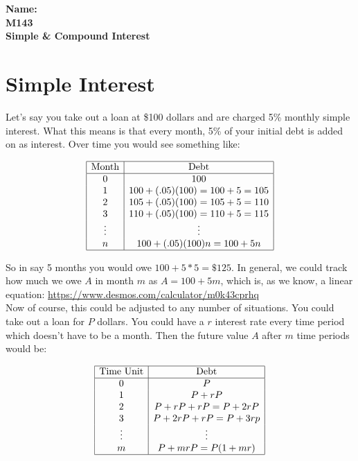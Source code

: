 \documentclass[10pt]{article}
\theoremstyle{definition}
\begin{document}
%

{\bf Name:} \hrulefill\hrulefill\hrulefill\\
{\bf M143} \qquad \qquad \\
{\bf Simple \& Compound Interest}\\ %



\section{Simple Interest}

Let's say you take out a loan at \$100 dollars and are charged 5\% monthly simple interest.  What this means is that every month, 5\% of your initial debt is added on as interest.  Over time you would see something like:

$$\begin{array}{|c|c|}
\hline
\text{Month} & \text{Debt}\\
\hline
0 & 100\\
1& 100+(.05)(100)=100+5=105\\
2& 105+(.05)(100)=105+5=110\\
3 & 110+(.05)(100)=110+5=115\\
\vdots & \vdots\\
n & 100+(.05)(100)n=100+5n\\
\hline
\end{array}$$

So in say 5 months you would owe $100+5*5=\$125$.  In general, we could track how much we owe $A$ in month $m$ as $A=100+5m$, which is, as we know, a linear equation: \url{https://www.desmos.com/calculator/m0k43cprhq} \\

Now of course, this could be adjusted to any number of situations.  You could take out a loan for $P$ dollars.  You could have a $r$ interest rate every time period which doesn't have to be a month.  Then the future value $A$ after $m$ time periods would be:

$$\begin{array}{|c|c|}
\hline
\text{Time Unit} & \text{Debt}\\
\hline
0 & P\\
1& P+rP\\
2& P+rP+rP=P+2rP\\
3 & P+2rP+rP=P+3rp\\
\vdots & \vdots\\
m & P+mrP=P(1+mr)\\
\hline
\end{array}$$
\end{document}
